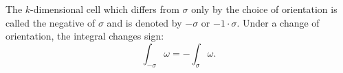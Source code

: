 The $k$-dimensional cell which differs from $\sigma$ only by the choice of orientation is called the negative of $\sigma$ and is denoted by $-\sigma$ or $-1 \cdot \sigma$. Under a change of orientation, the integral changes sign:
$$\int_{-\sigma} \omega = -\int_{\sigma} \omega.$$
